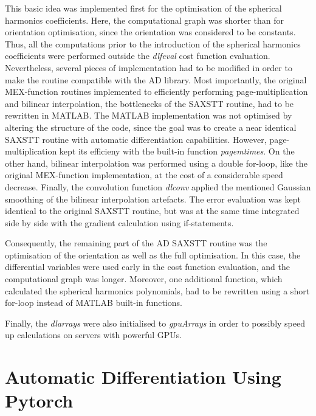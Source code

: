 This basic idea was implemented first for the optimisation of the spherical harmonics coefficients.
Here, the computational graph was shorter than for orientation optimisation, since the orientation was considered to be constants.
Thus, all the computations prior to the introduction of the spherical harmonics coefficients were performed outside the \emph{dlfeval} cost function evaluation.
Nevertheless, several pieces of implementation had to be modified in order to make the routine compatible with the AD library.
Most importantly, the original MEX-function routines implemented to efficiently performing page-multiplication and bilinear interpolation, the bottlenecks of the SAXSTT routine, had to be rewritten in MATLAB.
The MATLAB implementation was not optimised by altering the structure of the code, since the goal was to create a near identical SAXSTT routine with automatic differentiation capabilities.
However, page-multiplication kept its efficieny with the built-in function \emph{pagemtimes}.
On the other hand, bilinear interpolation was performed using a double for-loop, like the original MEX-function implementation, at the cost of a considerable speed decrease.
Finally, the convolution function \emph{dlconv} applied the mentioned Gaussian smoothing of the bilinear interpolation artefacts. %
The error evaluation was kept identical to the original SAXSTT routine, but was at the same time integrated side by side with the gradient calculation using if-statements.

Consequently, the remaining part of the AD SAXSTT routine was the optimisation of the orientation as well as the full optimisation.
In this case, the differential variables were used early in the cost function evaluation, and the computational graph was longer.
Moreover, one additional function, which calculated the spherical harmonics polynomials, had to be rewritten using a short for-loop instead of MATLAB built-in functions.

Finally, the \emph{dlarrays} were also initialised to \emph{gpuArrays} in order to possibly speed up calculations on servers with powerful GPUs.


\section{Automatic Differentiation Using Pytorch}\label{sec:AD_pytorch}

